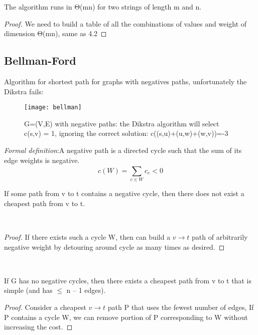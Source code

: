 \begin{claim}
    The algorithm runs in Θ(mn) for two strings of length m and n.
\end{claim}

\begin{proof}
    We need to build a table of all the combinations of values and weight of dimension Θ(mn), same as 4.2
\end{proof}

\subsection{Bellman-Ford}
Algorithm for shortest path for graphs with negatives paths, unfortunately the Dikstra fails:

\begin{figure}[H]
    \centering
    \texttt{[image: bellman]}
    \caption{G=(V,E) with negative paths: the Dikstra algorithm will select c(s,v) = 1, ignoring the correct solution: c((s,u)+(u,w)+(w,v))=-3}
\end{figure}

\emph{Formal definition}:A negative path is a directed cycle such that the sum of its edge weights is negative.
\[ c(W) = \sum_{e \in W}^{} c_{e} < 0 \]

\begin{claim}
    If some path from v to t contains a negative cycle, then there does not exist a cheapest path from v to t.
\end{claim}\\

\begin{proof}
    If there exists such a cycle W, then can build a $v \rightarrow t$ path of arbitrarily negative weight by detouring around cycle as many times as desired.
\end{proof}\\

\begin{claim}
    If G has no negative cycles, then there exists a cheapest path from v to t that is simple (and has $\leq$ n – 1 edges).
\end{claim}

\begin{proof}
    Consider a cheapest $v\rightarrow t$ path P that uses the fewest number of edges, If P contains a cycle W, we can remove portion of P corresponding to W
    without increasing the cost.
\end{proof}\\

